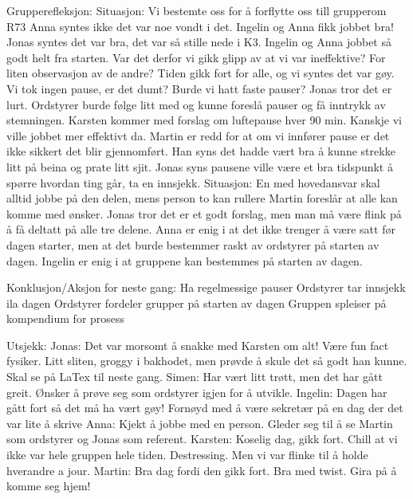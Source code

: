 Grupperefleksjon:
Situasjon: Vi bestemte oss for å forflytte oss till grupperom R73
Anna syntes ikke det var noe vondt i det. Ingelin og Anna fikk jobbet bra! Jonas syntes det var bra, det var så stille nede i K3. Ingelin og Anna jobbet så godt helt fra starten. Var det derfor vi gikk glipp av at vi var ineffektive? For liten observasjon av de andre? Tiden gikk fort for alle, og vi syntes det var gøy. Vi tok ingen pause, er det dumt? Burde vi hatt faste pauser? Jonas tror det er lurt. Ordstyrer burde følge litt med og kunne foreslå pauser og få inntrykk av stemningen. Karsten kommer med forslag om luftepause hver 90 min. Kanskje vi ville jobbet mer effektivt da. Martin er redd for at om vi innfører pause er det ikke sikkert det blir gjennomført. Han syns det hadde vært bra å kunne strekke litt på beina og prate litt sjit. Jonas syns pausene ville være et bra tidspunkt å spørre hvordan ting går, ta en innsjekk.
Situasjon: En med hovedansvar skal alltid jobbe på den delen, mens person to kan rullere
Martin foreslår at alle kan komme med ønsker. Jonas tror det er et godt forslag, men man må være flink på å få deltatt på alle tre delene. Anna er enig i at det ikke trenger å være satt før dagen starter, men at det burde bestemmer raskt av ordstyrer på starten av dagen. Ingelin er enig i at gruppene kan bestemmes på starten av dagen.

Konklusjon/Aksjon for neste gang:
Ha regelmessige pauser
Ordstyrer tar innsjekk ila dagen
Ordstyrer fordeler grupper på starten av dagen
Gruppen spleiser på kompendium for prosess

Utsjekk:
Jonas: Det var morsomt å snakke med Karsten om alt! Være fun fact fysiker. Litt sliten, groggy i bakhodet, men prøvde å skule det så godt han kunne. Skal se på LaTex til neste gang.
Simen: Har vært litt trøtt, men det har gått greit. Ønsker å prøve seg som ordstyrer igjen for å utvikle.
Ingelin: Dagen har gått fort så det må ha vært gøy! Fornøyd med å være sekretær på en dag der det var lite å skrive
Anna: Kjekt å jobbe med en person. Gleder seg til å se Martin som ordstyrer og Jonas som referent.
Karsten: Koselig dag, gikk fort. Chill at vi ikke var hele gruppen hele tiden. Destressing. Men vi var flinke til å holde hverandre a jour.
Martin: Bra dag fordi den gikk fort. Bra med twist. Gira på å komme seg hjem!